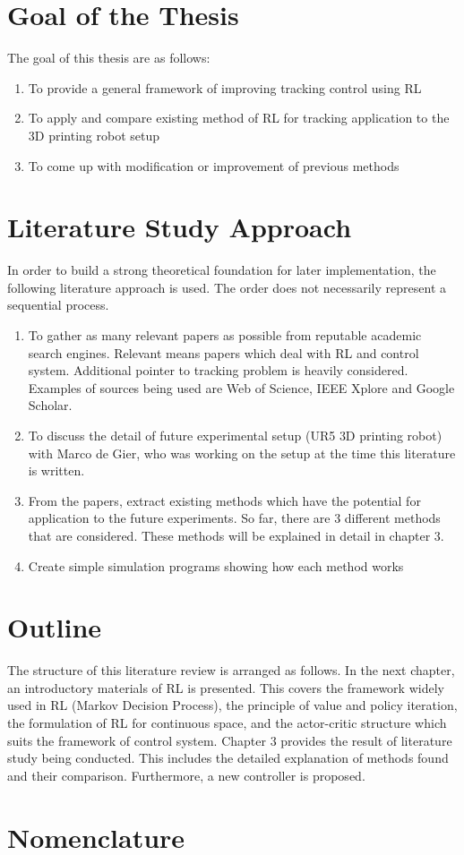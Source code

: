 \section{Goal of the Thesis}

The goal of this thesis are as follows:
\begin{enumerate}
\item To provide a general framework of improving tracking control using \ac{RL}
\item To apply and compare existing method of \ac{RL} for tracking application to the 3D printing robot setup
\item To come up with modification or improvement of previous methods
\end{enumerate}

\section{Literature Study Approach}
In order to build a strong theoretical foundation for later implementation, the following literature approach is used. The order does not necessarily represent a sequential process.
\begin{enumerate}
	\item To gather as many relevant papers as possible from reputable academic search engines. Relevant means papers which deal with \ac{RL} and control system. Additional pointer to tracking problem is heavily considered. Examples of sources being used are Web of Science, IEEE Xplore and Google Scholar.
	\item To discuss the detail of future experimental setup (UR5 \ac{3D} printing robot) with Marco de Gier, who was working on the setup at the time this literature is written.
	\item From the papers, extract existing methods which have the potential for application to the future experiments. So far, there are 3 different methods that are considered. These methods will be explained in detail in chapter 3.
	\item Create simple simulation programs showing how each method works
	
\end{enumerate}


\section{Outline}

The structure of this literature review is arranged as follows. In the next chapter, an introductory materials of \ac{RL} is presented. This covers the framework widely used in \ac{RL} (Markov Decision Process), the principle of value and policy iteration, the formulation of \ac{RL} for continuous space, and the actor-critic structure which suits the framework of control system. Chapter 3 provides the result of literature study being conducted. This includes the detailed explanation of methods found and their comparison. Furthermore, a new controller is proposed. 

\section{Nomenclature}


